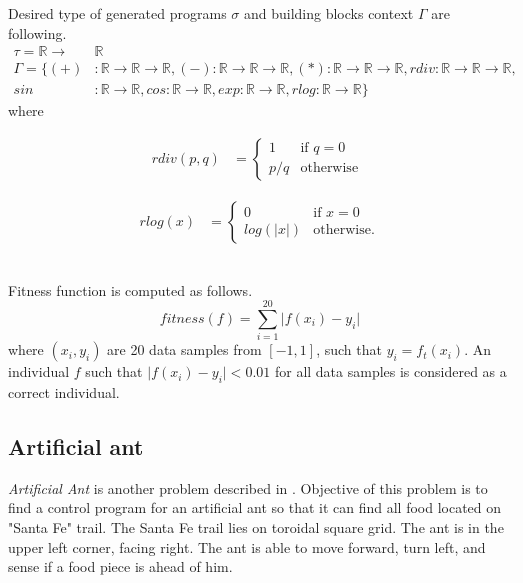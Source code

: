 \documentclass{llncs}
\newcommand{\ar}{\rightarrow\xspace}
\newcommand{\Real}{\mathbb{R}}
\begin{document}
Desired type of generated programs $\sigma$ and 
building blocks context $\Gamma$ are following.
\begin{align*}
\tau = \Real \ar &\Real\\
\Gamma = \{
  (+)  &: \Real \ar \Real \ar \Real    ,
  (-)   : \Real \ar \Real \ar \Real    ,
  (*)   : \Real \ar \Real \ar \Real    ,
  rdiv  : \Real \ar \Real \ar \Real    ,\\
  sin  &: \Real \ar \Real              ,
  cos   : \Real \ar \Real              ,
  exp   : \Real \ar \Real              , 
  rlog  : \Real \ar \Real              \}
\end{align*}
where
\noindent
\begin{minipage}{.5\linewidth}
\begin{align*}
rdiv(p,q) &= \begin{cases} 1 &\mbox{if } q = 0 \\
p/q & \mbox{otherwise } \end{cases}  
\end{align*}
\end{minipage}%
\begin{minipage}{.5\linewidth}
\begin{align*}
rlog(x) &= \begin{cases} 0 &\mbox{if } x = 0 \\
log(\vert x\vert) & \mbox{otherwise}. \end{cases}
\end{align*}
\end{minipage}
~\\
Fitness function is computed as follows.
$$ fitness(f) =  \sum\limits_{i=1}^{20}{ \vert f(x_i)-y_i }\vert   $$
where $(x_i,y_i)$ are 20 data samples from $[-1,1]$, such that $y_i = f_t(x_i)$.
An individual $f$ such that $\vert f(x_i)-y_i \vert < 0.01 $ for all data samples is 
considered as a correct individual.


\subsection{Artificial ant}

\textit{Artificial Ant} is another problem described
in \cite{koza92}. Objective of this problem is to 
find a control program for an artificial ant so
that it can find all food located on "Santa Fe" trail.
The Santa Fe trail lies on toroidal square grid.
The ant is in the upper left corner, facing right.
The ant is able to move forward, turn left, and sense if a food 
piece is ahead of him.
\end{document}
